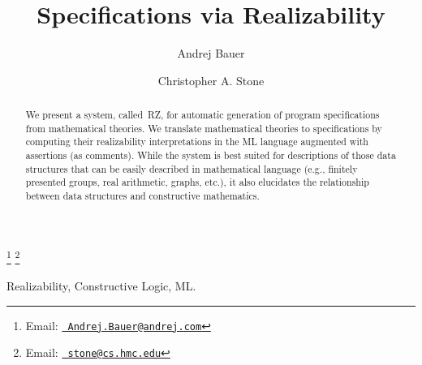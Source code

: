 \documentclass{entcs}
\newcommand{\RZ}{RZ\xspace}
\begin{document}
\def\lastname{Bauer and Stone}
\begin{frontmatter}
  \title{Specifications via Realizability} 
  \author{Andrej Bauer}
  \address{Department of Mathematics and Physics\\ 
    University of Ljubljana\\
    Ljubljana, Slovenia} \author{Christopher A. Stone}
  \address{Computer Science Department\\Harvey Mudd College\\
    Claremont, CA, USA} \thanks[myemail]{Email:
    \href{mailto:Andrej.Bauer@andrej.com} {\texttt{\normalshape
        Andrej.Bauer@andrej.com}}} \thanks[coemail]{Email:
    \href{mailto:stone@cs.hmc.edu} {\texttt{\normalshape
        stone@cs.hmc.edu}}}
\begin{abstract} 
  We present a system, called~\RZ, for automatic generation of program
  specifications from mathematical theories. We translate mathematical
  theories to specifications by computing their realizability
  interpretations in the ML language augmented with assertions (as
  comments). While the system is best suited for descriptions of those
  data structures that can be easily described in mathematical
  language (e.g., finitely presented groups, real arithmetic, graphs,
  etc.), it also elucidates the relationship between data structures
  and constructive mathematics.
\end{abstract}
\begin{keyword}
  Realizability, Constructive Logic, ML.
\end{keyword}
\end{frontmatter}

















\end{document}
